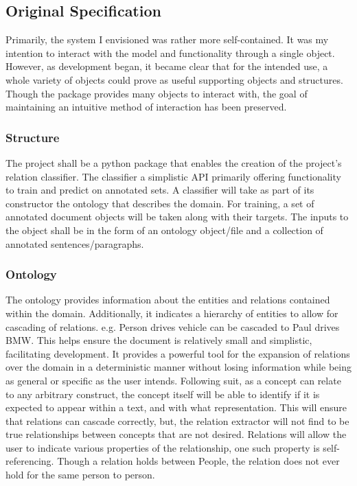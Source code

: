 \documentclass[12pt]{article} %
\begin{document}
\subsection{Original Specification}

Primarily, the system I envisioned was rather more self-contained. It was my intention to interact with the model and functionality through a single object. However, as development began, it became clear that for the intended use, a whole variety of objects could prove as useful supporting objects and structures. Though the package provides many objects to interact with, the goal of maintaining an intuitive method of interaction has been preserved.

\subsubsection{Structure}

The project shall be a python package that enables the creation of the project’s relation classifier. The classifier a simplistic API primarily offering functionality to train and predict on annotated sets. A classifier will take as part of its constructor the ontology that describes the domain. For training, a set of annotated document objects will be taken along with their targets. The inputs to the object shall be in the form of an ontology object/file and a collection of annotated sentences/paragraphs.

\subsubsection{Ontology}

The ontology provides information about the entities and relations contained within the domain. Additionally, it indicates a hierarchy of entities to allow for cascading of relations. e.g. Person drives vehicle can be cascaded to Paul drives BMW. This helps ensure the document is relatively small and simplistic, facilitating development. It provides a powerful tool for the expansion of relations over the domain in a deterministic manner without losing information while being as general or specific as the user intends. Following suit, as a concept can relate to any arbitrary construct, the concept itself will be able to identify if it is expected to appear within a text, and with what representation. This will ensure that relations can cascade correctly, but, the relation extractor will not find to be true relationships between concepts that are not desired. Relations will allow the user to indicate various properties of the relationship, one such property is self-referencing. Though a relation holds between People, the relation does not ever hold for the same person to person.
\end{document}
